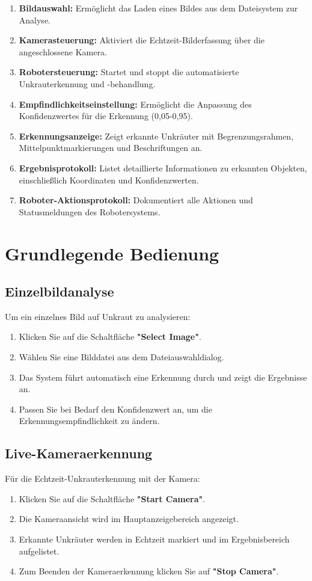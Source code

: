 \documentclass[12pt, a4paper]{scrreprt}
\begin{document}
\begin{enumerate}
    \item \textbf{Bildauswahl:} Ermöglicht das Laden eines Bildes aus dem Dateisystem zur Analyse.
    \item \textbf{Kamerasteuerung:} Aktiviert die Echtzeit-Bilderfassung über die angeschlossene Kamera.
    \item \textbf{Robotersteuerung:} Startet und stoppt die automatisierte Unkrauterkennung und -behandlung.
    \item \textbf{Empfindlichkeitseinstellung:} Ermöglicht die Anpassung des Konfidenzwertes für die Erkennung (0,05-0,95).
    \item \textbf{Erkennungsanzeige:} Zeigt erkannte Unkräuter mit Begrenzungsrahmen, Mittelpunktmarkierungen und Beschriftungen an.
    \item \textbf{Ergebnisprotokoll:} Listet detaillierte Informationen zu erkannten Objekten, einschließlich Koordinaten und Konfidenzwerten.
    \item \textbf{Roboter-Aktionsprotokoll:} Dokumentiert alle Aktionen und Statusmeldungen des Robotersystems.
\end{enumerate}

\section{Grundlegende Bedienung}

\subsection{Einzelbildanalyse}
Um ein einzelnes Bild auf Unkraut zu analysieren:
\begin{enumerate}
    \item Klicken Sie auf die Schaltfläche \textbf{"Select Image"}.
    \item Wählen Sie eine Bilddatei aus dem Dateiauswahldialog.
    \item Das System führt automatisch eine Erkennung durch und zeigt die Ergebnisse an.
    \item Passen Sie bei Bedarf den Konfidenzwert an, um die Erkennungsempfindlichkeit zu ändern.
\end{enumerate}

\subsection{Live-Kameraerkennung}
Für die Echtzeit-Unkrauterkennung mit der Kamera:
\begin{enumerate}
    \item Klicken Sie auf die Schaltfläche \textbf{"Start Camera"}.
    \item Die Kameraansicht wird im Hauptanzeigebereich angezeigt.
    \item Erkannte Unkräuter werden in Echtzeit markiert und im Ergebnisbereich aufgelistet.
    \item Zum Beenden der Kameraerkennung klicken Sie auf \textbf{"Stop Camera"}.
\end{enumerate}
\end{document}

